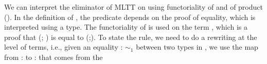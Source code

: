 We can interpret the  eliminator of MLTT on  using
  functoriality of  and of product (). In the definition
  of , the predicate  depends on the proof of equality, which is
  interpreted using a  type. The functoriality of  is used on
  the term    \coqdocvariable{$\gamma$}, which is a proof that (; ) is equal
  to (;). To state the rule, we need to do a rewriting at 
  the level of terms, i.e., given an equality  :  $\sim_1$  between two 
  types in , we use the map from  :   to 
     :   that comes from the
